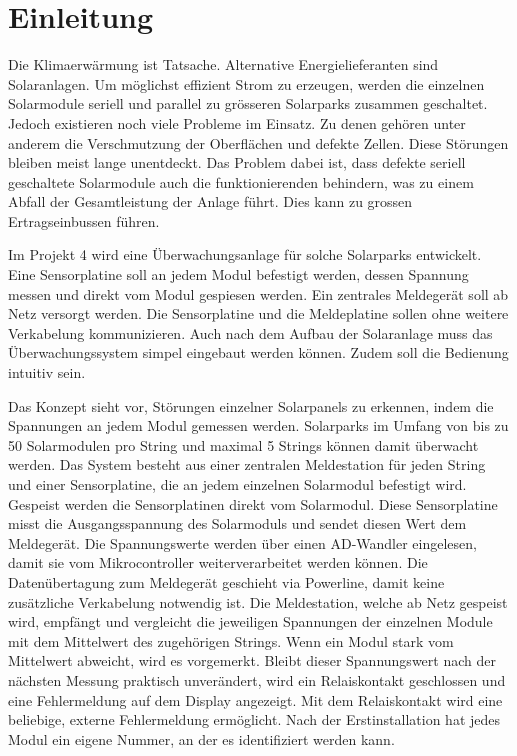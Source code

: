 \section{Einleitung}


Die Klimaerwärmung ist Tatsache. Alternative Energielieferanten sind Solaranlagen. Um möglichst effizient Strom zu erzeugen, werden die einzelnen Solarmodule seriell und parallel zu grösseren Solarparks zusammen geschaltet. Jedoch existieren noch viele Probleme im Einsatz. Zu denen gehören unter anderem die Verschmutzung der Oberflächen und defekte Zellen. Diese Störungen bleiben meist lange unentdeckt. Das Problem dabei ist, dass defekte seriell geschaltete Solarmodule auch die funktionierenden behindern, was zu einem Abfall der Gesamtleistung der Anlage führt. Dies kann zu grossen Ertragseinbussen führen.


Im Projekt 4 wird eine Überwachungsanlage für solche Solarparks entwickelt. Eine Sensorplatine soll an jedem Modul befestigt werden, dessen Spannung messen und direkt vom Modul gespiesen werden. Ein zentrales Meldegerät soll ab Netz versorgt werden. Die Sensorplatine und die Meldeplatine sollen ohne weitere Verkabelung kommunizieren. Auch nach dem Aufbau der Solaranlage muss das Überwachungssystem simpel eingebaut werden können. Zudem soll die Bedienung intuitiv sein.

Das Konzept sieht vor, Störungen einzelner Solarpanels zu erkennen, indem die Spannungen an jedem Modul gemessen werden. Solarparks im Umfang von bis zu 50 Solarmodulen pro String und maximal 5 Strings können damit überwacht werden. Das System besteht aus einer zentralen Meldestation für jeden String und einer Sensorplatine, die an jedem einzelnen Solarmodul befestigt wird. Gespeist werden die Sensorplatinen direkt vom Solarmodul. Diese Sensorplatine misst die Ausgangsspannung des Solarmoduls und sendet diesen Wert dem Meldegerät. Die Spannungswerte werden über einen AD-Wandler eingelesen, damit sie vom Mikrocontroller weiterverarbeitet werden können. Die Datenübertagung zum Meldegerät geschieht via Powerline, damit keine zusätzliche Verkabelung notwendig ist. Die Meldestation, welche ab Netz gespeist wird, empfängt und vergleicht die jeweiligen Spannungen der einzelnen Module mit dem Mittelwert des zugehörigen Strings. Wenn ein Modul stark vom Mittelwert abweicht, wird es vorgemerkt. Bleibt dieser Spannungswert nach der nächsten Messung praktisch unverändert, wird ein Relaiskontakt geschlossen und eine Fehlermeldung auf dem Display angezeigt. Mit dem Relaiskontakt wird eine beliebige, externe Fehlermeldung ermöglicht. Nach der Erstinstallation hat jedes Modul ein eigene Nummer, an der es identifiziert werden kann.

